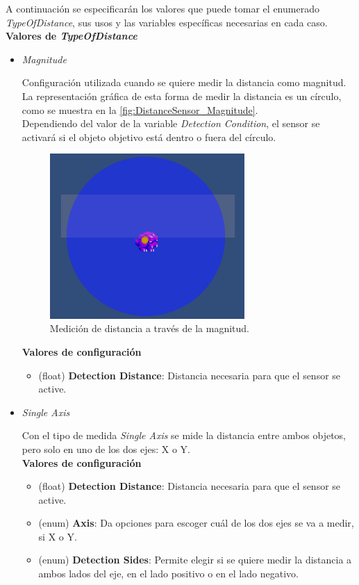 A continuación se especificarán los valores que puede tomar el enumerado \textit{TypeOfDistance}, sus usos y las variables específicas necesarias en cada caso.\\

\textbf{Valores de \textit{TypeOfDistance}}

\begin{itemize}
	\item \textit{Magnitude}

Configuración utilizada cuando se quiere medir la distancia como magnitud. La representación gráfica de esta forma de medir la distancia es un círculo, como se muestra en la \autoref{fig:DistanceSensor_Magnitude}.\\
Dependiendo del valor de la variable \textit{Detection Condition}, el sensor se activará si el objeto objetivo está dentro o fuera del círculo.
	\begin{figure}[t]
		\centering
		\includegraphics[width = 0.7\textwidth]{Imagenes/DistanceSensorMagnitude.png}
		\caption{Medición de distancia a través de la magnitud.}
		\label{fig:DistanceSensor_Magnitude}
	\end{figure}

\textbf{Valores de configuración}
	\begin{itemize}
	        \item (float) \textbf{Detection Distance}: Distancia necesaria para que el sensor se active.
	 \end{itemize}

	\item \textit{Single Axis}

Con el tipo de medida \textit{Single Axis} se mide la distancia entre ambos objetos, pero solo en uno de los dos ejes: X o Y.\\

\textbf{Valores de configuración}
	\begin{itemize}
	        \item (float) \textbf{Detection Distance}: Distancia necesaria para que el sensor se active.
	        \item (enum) \textbf{Axis}: Da opciones para escoger cuál de los dos ejes se va a medir, si X o Y.
	        \item (enum) \textbf{Detection Sides}: Permite elegir si se quiere medir la distancia a ambos lados del eje, en el lado positivo o en el lado negativo.
	 \end{itemize}
\end{itemize}

